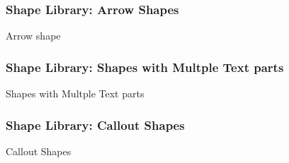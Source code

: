 \documentclass[ aspectratio=169,  12pt,blue,xcolor=pdftex,dvipsnames,table,handout,notes]{beamer}
\begin{document}
		\begin{frame}[t]
		\frametitle{Shape Library: Arrow Shapes}

			\begin{block}{Arrow shape}
			\end{block}

		\end{frame}






		\begin{frame}[t]
		\frametitle{Shape Library: Shapes with Multple Text parts}

			\begin{block}{Shapes with Multple Text parts}
			\end{block}

		\end{frame}




		\begin{frame}[t]
		\frametitle{Shape Library: Callout Shapes}

			\begin{block}{Callout Shapes}
			\end{block}

		\end{frame}

		\begin{frame}[plain]

			\centering
			\scalebox{4}{Text}
	
		\end{frame}
\end{document}

